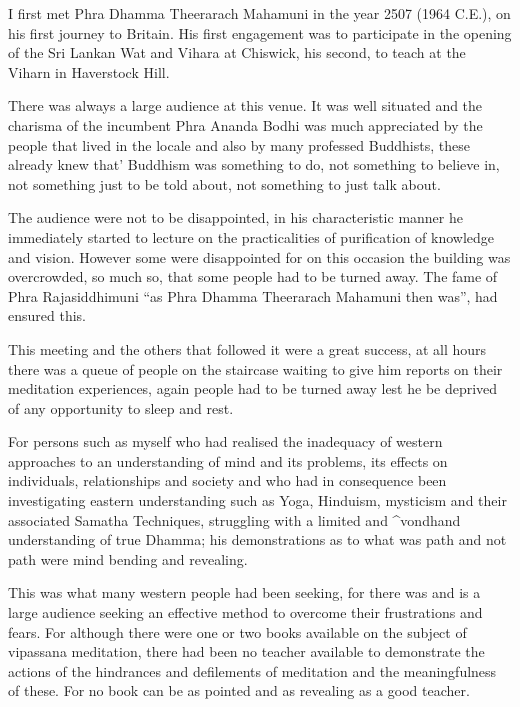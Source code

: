 \documentclass[a5paper,10pt,english]{book}
\begin{document}
\sphinxAtStartPar
I first met Phra Dhamma Theerarach Mahamuni in the year 2507 (1964 C.E.), on his first journey to Britain. His first engagement was to participate in the opening of the Sri Lankan Wat and Vihara at Chiswick, his second, to teach at the Viharn in Haverstock Hill.

\sphinxAtStartPar
There was always a large audience at this venue. It was well situated and the charisma of the incumbent Phra Ananda Bodhi was much appreciated by the people that lived in the locale and also by many professed Buddhists, these already knew that’ Buddhism was something to do, not something to believe in, not something just to be told about, not something to just talk about.

\sphinxAtStartPar
The audience were not to be disappointed, in his characteristic manner he immediately started to lecture on the practicalities of purification of knowledge and vision. However some were disappointed for on this occasion the building was overcrowded, so much so, that some people had to be turned away. The fame of Phra Rajasiddhimuni “as Phra Dhamma Theerarach Mahamuni then was”, had ensured this.

\sphinxAtStartPar
This meeting and the others that followed it were a great success, at all hours there was a queue of people on the staircase waiting to give him reports on their meditation experiences, again people had to be turned away lest he be deprived of any opportunity to sleep and rest.

\sphinxAtStartPar
For persons such as myself who had realised the inadequacy of western approaches to an understanding of mind and its problems, its effects on individuals, relationships and society and who had in consequence been investigating eastern understanding such as Yoga, Hinduism, mysticism and their associated Samatha Techniques, struggling with a limited and \textasciicircum{}vondhand understanding of true Dhamma; his demonstrations as to what was path and not path were mind bending and revealing.

\sphinxAtStartPar
This was what many western people had been seeking, for there was and is a large audience seeking an effective method to overcome their frustrations and fears. For although there were one or two books available on the subject of vipassana meditation, there had been no teacher available to demonstrate the actions of the hindrances and defilements of meditation and the meaningfulness of these. For no book can be as pointed and as revealing as a good teacher.
\end{document}
